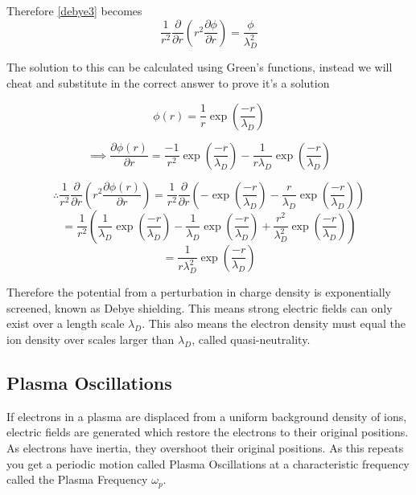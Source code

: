 Therefore \eqref{debye3} becomes
\begin{equation}
	\frac{1}{r^2}\frac{\partial}{\partial r}\left(r^2 \frac{\partial \phi}{\partial r}\right) = \frac{\phi}{\lambda_D^2}
\end{equation}

The solution to this can be calculated using Green's functions, instead we will cheat and substitute in the correct answer to prove it's a solution

\begin{equation}
	\phi(r) = \frac{1}{r}\exp\left(\frac{-r}{\lambda_D}\right)
\end{equation}

\begin{equation}
	\implies \frac{\partial \phi(r)}{\partial r} = \frac{-1}{r^2}\exp\left(\frac{-r}{\lambda_D}\right) - \frac{1}{r \lambda_D}\exp\left(\frac{-r}{\lambda_D}\right)
\end{equation}

\begin{equation}
	\therefore \frac{1}{r^2}\frac{\partial}{\partial r}\left(r^2 \frac{\partial \phi(r)}{\partial r}\right) = \frac{1}{r^2}\frac{\partial}{\partial r}\left(-\exp\left(\frac{-r}{\lambda_D}\right) - \frac{r}{\lambda_D}\exp\left(\frac{-r}{\lambda_D}\right)\right)
\end{equation}
\begin{equation}
	=\frac{1}{r^2}\left(\frac{1}{\lambda_D}\exp\left(\frac{-r}{\lambda_D}\right) - \frac{1}{\lambda_D}\exp\left(\frac{-r}{\lambda_D}\right) + \frac{r^2}{\lambda_D^2}\exp\left(\frac{-r}{\lambda_D}\right)\right)
\end{equation}
\begin{equation}
	= \frac{1}{r \lambda_D^2}\exp\left(\frac{-r}{\lambda_D}\right)
\end{equation}

Therefore the potential from a perturbation in charge density is exponentially screened, known as Debye shielding. This means strong electric fields can only exist over a length scale $\lambda_D$. This also means the electron density must equal the ion density over scales larger than $\lambda_D$, called quasi-neutrality. 

\subsection{Plasma Oscillations}
If electrons in a plasma are displaced from a uniform background density of ions, electric fields are generated which restore the electrons to their original positions. As electrons have inertia, they overshoot their original positions. As this repeats you get a periodic motion called Plasma Oscillations at a characteristic frequency called the Plasma Frequency $\omega_p$.

